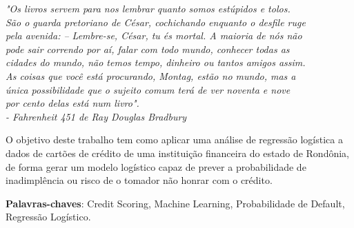 \documentclass[
	12pt,				%
	openright,			%
	oneside,      %
	a4paper,			%
	english,			%
	french,				%
	spanish,			%
	brazil,				%
	]{abntex2}\usepackage[]{graphicx}\usepackage[table]{xcolor}
\theoremstyle{definition}
\begin{document}

\frenchspacing


\imprimircapa

\imprimirfolhaderosto
\clearpage

\begin{epigrafe} 
  \vspace*{\fill} 
  \begin{flushright} 
  \textit{"Os livros servem para nos lembrar quanto somos estúpidos e tolos. 
      \\ São o guarda pretoriano de César, cochichando enquanto o desfile ruge 
      \\ pela avenida: – Lembre-se, César, tu és mortal. A maioria de nós não 
      \\ pode sair correndo por aí, falar com todo mundo, conhecer todas as 
      \\ cidades do mundo, não temos tempo, dinheiro ou tantos amigos assim. 
      \\ As coisas que você está procurando, Montag, estão no mundo, mas a 
      \\ única possibilidade que o sujeito comum terá de ver noventa e nove 
      \\ por cento delas está num livro". 
      \\ - Fahrenheit 451 de Ray Douglas Bradbury} 
  \end{flushright} 
\end{epigrafe}

\begin{resumo} 
  O objetivo deste trabalho tem como aplicar uma análise de regressão logística a dados
  de cartões de crédito de uma instituição financeira do estado de Rondônia, de forma
  gerar um modelo logístico capaz de prever a probabilidade de inadimplência ou risco
  de o tomador não honrar com o crédito.
  \vspace{\onelineskip} 
  \noindent
  
  \textbf{Palavras-chaves}: Credit Scoring, Machine Learning, Probabilidade de Default, Regressão Logístico. 
\end{resumo}
\end{document}
